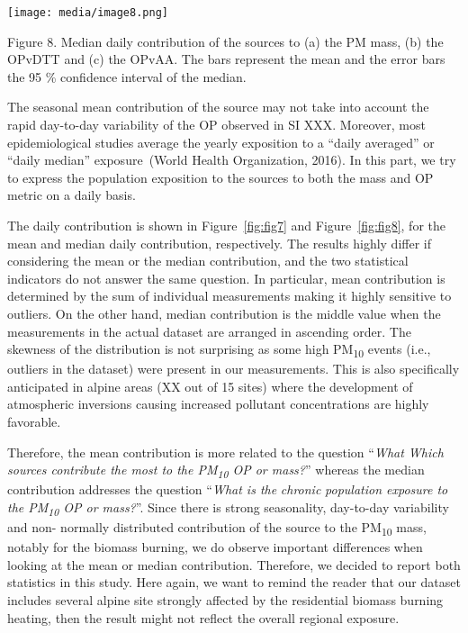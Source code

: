\documentclass[
]{article}
\begin{document}
\texttt{[image: media/image8.png]}

Figure 8. Median daily contribution of the sources to (a) the PM mass,
(b) the OPvDTT and (c) the OPvAA. The bars represent the mean and the
error bars the 95 \% confidence interval of the median.

The seasonal mean contribution of the source may not take into account
the rapid day-to-day variability of the OP observed in SI XXX. Moreover,
most epidemiological studies average the yearly exposition to a ``daily
averaged'' or ``daily median'' exposure~(World Health Organization,
2016). In this part, we try to express the population exposition to the
sources to both the mass and OP metric on a daily basis.

The daily contribution is shown in
Figure~\protect\hyperlink{fig:fig7}{{[}fig:fig7{]}} and
Figure~\protect\hyperlink{fig:fig8}{{[}fig:fig8{]}}, for the mean and
median daily contribution, respectively. The results highly differ if
considering the mean or the median contribution, and the two statistical
indicators do not answer the same question. In particular, mean
contribution is determined by the sum of individual measurements making
it highly sensitive to outliers. On the other hand, median contribution
is the middle value when the measurements in the actual dataset are
arranged in ascending order. The skewness of the distribution is not
surprising as some high PM\textsubscript{10} events (i.e., outliers in
the dataset) were present in our measurements. This is also specifically
anticipated in alpine areas (XX out of 15 sites) where the development
of atmospheric inversions causing increased pollutant concentrations are
highly favorable.

Therefore, the mean contribution is more related to the question
``\emph{What Which sources contribute the most to the
PM\textsubscript{10} OP or mass?}'' whereas the median contribution
addresses the question ``\emph{What is the} \emph{chronic}
\emph{population exposure to the PM\textsubscript{10} OP or mass?}''.
Since there is strong seasonality, day-to-day variability and non-
normally distributed contribution of the source to the
PM\textsubscript{10} mass, notably for the biomass burning, we do
observe important differences when looking at the mean or median
contribution. Therefore, we decided to report both statistics in this
study. Here again, we want to remind the reader that our dataset
includes several alpine site strongly affected by the residential
biomass burning heating, then the result might not reflect the overall
regional exposure.
\end{document}
